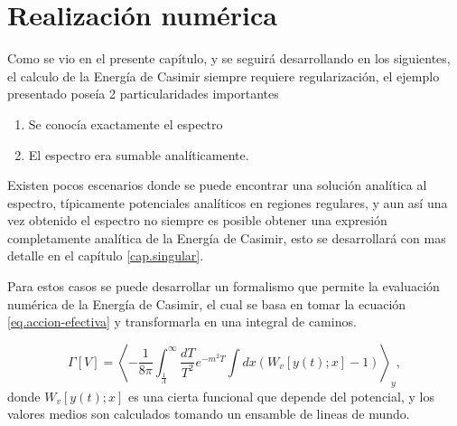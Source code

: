 \section{Realización numérica}

Como se vio en el presente capítulo, y se seguirá desarrollando en los siguientes, el calculo de la Energía de Casimir siempre requiere regularización, el ejemplo presentado poseía 2 particularidades importantes
\begin{enumerate}
\item Se conocía exactamente el espectro 
\item El espectro era sumable analíticamente.
\end{enumerate}
Existen pocos escenarios donde se puede encontrar una solución analítica al espectro, típicamente potenciales analíticos en regiones regulares, y aun así una vez obtenido el espectro no siempre es posible obtener una expresión completamente analítica de la Energía de Casimir, esto se desarrollará con mas detalle en el capítulo \ref{cap.singular}.

Para estos casos se puede desarrollar un formalismo que permite la evaluación numérica de la Energía de Casimir, el cual se basa en tomar la ecuación  \eqref{eq.accion-efectiva} y transformarla en una integral de caminos.

\begin{equation}
\Gamma \left[ V \right] = 
\left<
-  \frac{1}{8 \pi}
\int _{\frac{1}{\Lambda}} ^{\infty} \frac{dT}{T^ {2}} e ^{- m^2 T}
\int dx \left( W _v [ y(t); x] - 1\right)
\right> _{y} 
 ,
\end{equation}
donde $W _v [ y(t); x]$ es una cierta funcional que depende del potencial, y los valores medios son calculados tomando un ensamble de lineas de mundo.








